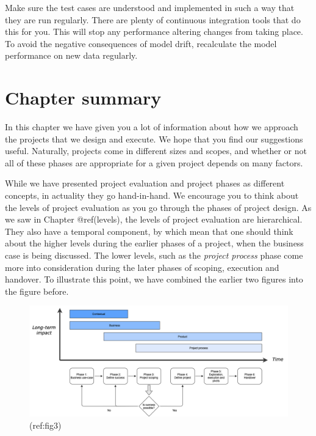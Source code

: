 \documentclass[
]{book}
\begin{document}
Make sure the test cases are understood and implemented in such a way
that they are run regularly. There are plenty of continuous integration
tools that do this for you. This will stop any performance altering
changes from taking place. To avoid the negative consequences of model
drift, recalculate the model performance on new data regularly.

\hypertarget{chapter-summary}{%
\section{Chapter summary}\label{chapter-summary}}

In this chapter we have given you a lot of information about how we
approach the projects that we design and execute. We hope that you find
our suggestions useful. Naturally, projects come in different sizes and
scopes, and whether or not all of these phases are appropriate for a
given project depends on many factors.

While we have presented project evaluation and project phases as
different concepts, in actuality they go hand-in-hand. We encourage you
to think about the levels of project evaluation as you go through the
phases of project design. As we saw in Chapter @ref(levels), the levels
of project evaluation are hierarchical. They also have a temporal
component, by which mean that one should think about the higher levels
during the earlier phases of a project, when the business case is being
discussed. The lower levels, such as the \emph{project process} phase
come more into consideration during the later phases of scoping,
execution and handover. To illustrate this point, we have combined the
earlier two figures into the figure before.

\begin{figure}
\includegraphics[width=1\linewidth]{figures/Framework phases} \caption{(ref:fig3)}\label{fig:full-figure}
\end{figure}
\end{document}
